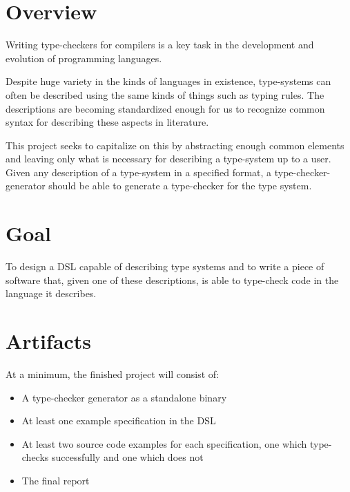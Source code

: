 \documentclass{ProgressReport}[2020/09/15]
\begin{document}
          \section{Overview}

          Writing type-checkers for compilers is a key task in the
          development and evolution of programming languages.

          Despite huge variety in the kinds of languages in existence,
          type-systems can often be described using the same kinds of
          things such as typing rules. The descriptions are becoming
          standardized enough for us to recognize common syntax for
          describing these aspects in literature.

          This project seeks to capitalize on this by abstracting
          enough common elements and leaving only what is necessary
          for describing a type-system up to a user. Given any
          description of a type-system in a specified format, a
          type-checker-generator should be able to generate a
          type-checker for the type system.
          
          \section{Goal}

          To design a DSL capable of describing type systems and to
          write a piece of software that, given one of these
          descriptions, is able to type-check code in the language
          it describes.

          \section{Artifacts}

          At a minimum, the finished project will consist of:

          \begin{itemize}
          \item A type-checker generator as a standalone binary
          \item At least one example specification in the DSL
          \item At least two source code examples for each
            specification, one which type-checks successfully and one
            which does not
          \item The final report
          \end{itemize}
          
\end{document}
